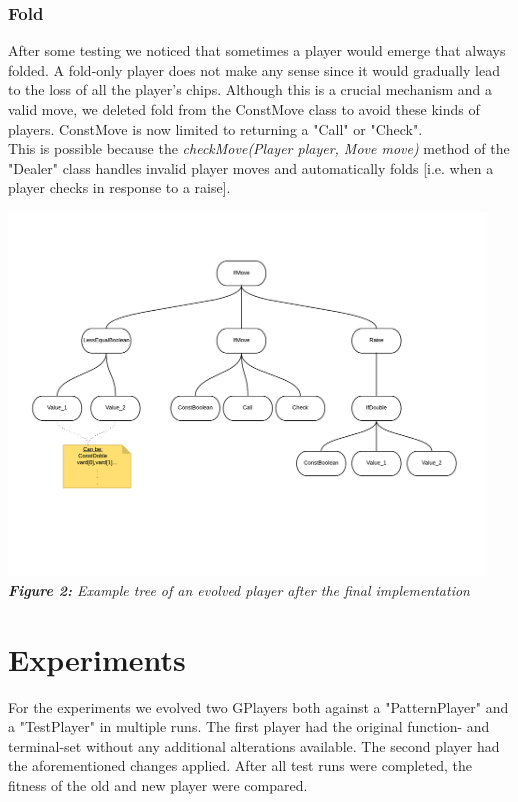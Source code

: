 \documentclass[12pt,fleqn,a4paper]{article}
\begin{document}
\subsubsection{Fold}
After some testing we noticed that sometimes a player would emerge that always folded. A fold-only player does not make any sense since it would gradually lead to the loss of all the player's chips. Although this is a crucial mechanism and a valid move, we deleted fold from the ConstMove class to avoid these kinds of players. ConstMove is now limited to returning a "Call" or "Check". \\
This is possible because the \textit{checkMove(Player player, Move move)} method of the "Dealer" class handles invalid player moves and automatically folds [i.e. when a player checks in response to a raise].

\begin{center}
	\includegraphics[width=0.95\textwidth]{NewRaise.png}
	\textit{\textbf{Figure 2: }Example tree of an evolved player after the final implementation}
\end{center}

\newpage
\section{Experiments}
For the experiments we evolved two GPlayers both against a "PatternPlayer" and a "TestPlayer" in multiple runs. The first player had the original function- and terminal-set without any additional alterations available. The second player had the aforementioned changes applied. After all test runs were completed, the fitness of the old and new player were compared.
\end{document}
